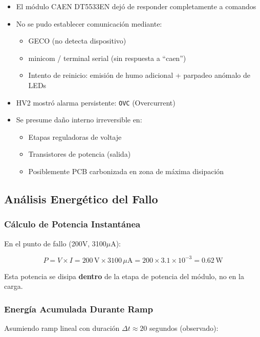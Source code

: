 \documentclass{article}
\begin{document}
\begin{itemize}
    \item El módulo CAEN DT5533EN dejó de responder completamente a comandos
    \item No se pudo establecer comunicación mediante:
    \begin{itemize}
        \item GECO (no detecta dispositivo)
        \item minicom / terminal serial (sin respuesta a ``caen'')
        \item Intento de reinicio: emisión de humo adicional + parpadeo anómalo de LEDs
    \end{itemize}
    \item HV2 mostró alarma persistente: \texttt{OVC} (Overcurrent)
    \item Se presume daño interno irreversible en:
    \begin{itemize}
        \item Etapas reguladoras de voltaje
        \item Transistores de potencia (salida)
        \item Posiblemente PCB carbonizada en zona de máxima disipación
    \end{itemize}
\end{itemize}

\subsection{Análisis Energético del Fallo}

\subsubsection{Cálculo de Potencia Instantánea}

En el punto de fallo (200V, 3100\(\mu\)A):

\[
P = V \times I = 200\,\text{V} \times 3100\,\mu\text{A} = 200 \times 3.1 \times 10^{-3} = 0.62\,\text{W}
\]

Esta potencia se disipa \textbf{dentro} de la etapa de potencia del módulo, no en la carga.

\subsubsection{Energía Acumulada Durante Ramp}

Asumiendo ramp lineal con duración \(\Delta t \approx 20\) segundos (observado):
\end{document}

